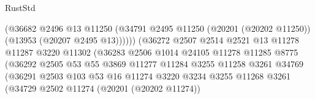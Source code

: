 \begin{lexlean}{RustStd}
\begin{coremodule}
                                          (@36682
                                            @2496
                                            @13
                                            @11250
                                            (@34791
                                              @2495
                                              @11250
                                              (@20201 (@20202 @11250))
                                              (@13953 (@20207 @2495 @13))))))
                                      (@36272
                                        @2507
                                        @2514
                                        @2521
                                        @13
                                        @11278
                                        @11287
                                        @3220
                                        @11302
                                        (@36283
                                          @2506
                                          @1014
                                          @24105
                                          @11278
                                          @11285
                                          @8775
                                          (@36292
                                            @2505
                                            @53
                                            @55
                                            @3869
                                            @11277
                                            @11284
                                            @3255
                                            @11258
                                            @3261
                                            @34769
                                            (@36291
                                              @2503
                                              @103
                                              @53
                                              @16
                                              @11274
                                              @3220
                                              @3234
                                              @3255
                                              @11268
                                              @3261
                                              (@34729
                                                @2502
                                                @11274
                                                (@20201 (@20202 @11274))

\end{coremodule}
\end{lexlean}
